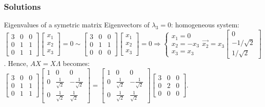 \begin{frame}
	\frametitle{Solutions}
	\begin{block}{Eigenvalues of a symetric matrix}
		Eigenvectors of $\lambda_3=0$: homogeneous system:\\
		$\begin{bmatrix}
		3 & 0& 0\\
		0 & 1 & 1\\
		0 & 1 & 1
		\end{bmatrix}\begin{bmatrix}
		x_1\\x_2\\x_3
		\end{bmatrix}=0 \sim \begin{bmatrix}
		3 & 0& 0\\
		0 & 1 & 1\\
		0 & 0 & 0
		\end{bmatrix}\begin{bmatrix}
		x_1\\x_2\\x_3
		\end{bmatrix}=0 \Rightarrow \begin{cases}
		x_1=0\\x_2=-x_3\\x_3=x_3
		\end{cases} \overrightarrow{x_2}=x_3\begin{bmatrix}
		0\\-1/\sqrt{2}\\1/\sqrt{2}
		\end{bmatrix}$. Hence, $AX=X\Lambda$ becomes: \\
		$\begin{bmatrix}
		3 & 0& 0\\
		0 & 1 & 1\\
		0 & 1 & 1
		\end{bmatrix}\begin{bmatrix}
		1 & 0 & 0\\
		0 & \frac{1}{\sqrt{2}} & -\frac{1}{\sqrt{2}}\\
		0 & \frac{1}{\sqrt{2}} & \frac{1}{\sqrt{2}}
		\end{bmatrix}=\begin{bmatrix}
		1 & 0 & 0\\
		0 & \frac{1}{\sqrt{2}} &-\frac{1}{\sqrt{2}}\\
		0 & \frac{1}{\sqrt{2}} & \frac{1}{\sqrt{2}}
		\end{bmatrix} \begin{bmatrix}
		3 & 0 & 0\\
		0 & 2 & 0\\
		0 & 0 & 0
		\end{bmatrix}$.
	\end{block}
\end{frame}

